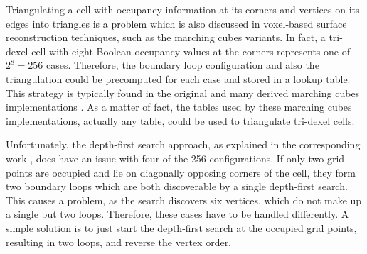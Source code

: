 Triangulating a cell with occupancy information at its corners and vertices on its edges into triangles is a problem which is also discussed in voxel-based surface reconstruction techniques, such as the marching cubes variants.
In fact, a tri-dexel cell with eight Boolean occupancy values at the corners represents one of $2^8 = 256$ cases.
Therefore, the boundary loop configuration and also the triangulation could be precomputed for each case and stored in a lookup table.
This strategy is typically found in the original and many derived marching cubes implementations \cite{marching_cubes}.
As a matter of fact, the tables used by these marching cubes implementations, actually any table, could be used to triangulate tri-dexel cells.

Unfortunately, the depth-first search approach, as explained in the corresponding work \cite{tridexel_reconstruction}, does have an issue with four of the 256 configurations.
If only two grid points are occupied and lie on diagonally opposing corners of the cell, they form two boundary loops which are both discoverable by a single depth-first search.
This causes a problem, as the search discovers six vertices, which do not make up a single but two loops.
Therefore, these cases have to be handled differently.
A simple solution is to just start the depth-first search at the occupied grid points, resulting in two loops, and reverse the vertex order.

